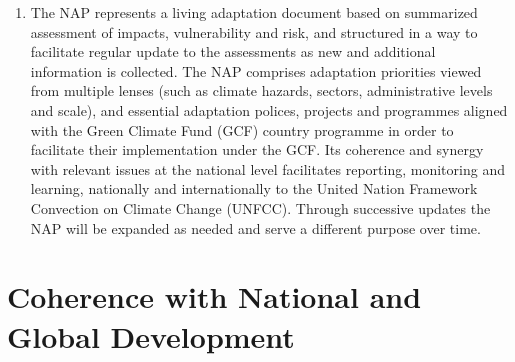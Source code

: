 \documentclass[
]{book}
\begin{document}
\begin{enumerate}
\item
  The NAP represents a living adaptation document based on summarized assessment of impacts, vulnerability and risk, and structured in a way to facilitate regular update to the assessments as new and additional information is collected. The NAP comprises adaptation priorities viewed from multiple lenses (such as climate hazards, sectors, administrative levels and scale), and essential adaptation polices, projects and programmes aligned with the Green Climate Fund (GCF) country programme in order to facilitate their implementation under the GCF. Its coherence and synergy with relevant issues at the national level facilitates reporting, monitoring and learning, nationally and internationally to the United Nation Framework Convection on Climate Change (UNFCC). Through successive updates the NAP will be expanded as needed and serve a different purpose over time.
\end{enumerate}

\hypertarget{coherence-with-national-and-global-development}{%
\section{Coherence with National and Global Development}\label{coherence-with-national-and-global-development}}
\end{document}
